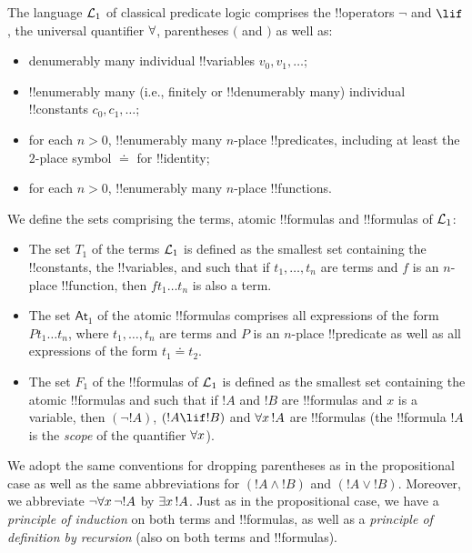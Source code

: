 \documentclass[../../include/open-logic-section]{subfiles}
\begin{document}


\begin{explain}
The language $\mathcal L_1$ of classical predicate logic comprises
the !!{operator}s $\lnot$ and $\lif$, the universal quantifier
$\lforall$, parentheses $($ and $)$ as well as:
\begin{itemize}
\item denumerably many individual !!{variable}s $v_0,v_1,\ldots$;
\item !!{enumerably} many (i.e., finitely or !!{denumerably} many)
individual
  !!{constant}s $c_0,c_1,\ldots$;
\item for each $n>0$, !!{enumerably} many $n$-place !!{predicate}s,
including at least the
  $2$-place symbol $\doteq$ for !!{identity};
\item for each $n>0$, !!{enumerably}  many   $n$-place !!{function}s.
\end{itemize}
\end{explain}

\begin{defn}
We define the sets comprising the terms, atomic !!{formula}s and
!!{formula}s
of $\mathcal L_1$:
  \begin{itemize}
  \item The set $T_1$ of the terms $\mathcal L_1$ is defined as the
    smallest set containing the !!{constant}s, the !!{variable}s, and such
    that if $t_1,\ldots,t_n$ are terms and $f$ is an $n$-place
    !!{function}, then $ft_1\ldots t_n$ is also a term.
  \item The set $\mathsf{At}_1$ of the atomic !!{formula}s comprises all
    expressions of the form $Pt_1\ldots t_n$, where $t_1,\ldots,t_n$
    are terms and $P$ is an $n$-place !!{predicate} as well as all
    expressions of the form $t_1 \doteq t_2$.
    \item The set $F_1$ of the !!{formula}s of $\mathcal L_1$ is defined
      as the smallest set containing the atomic !!{formula}s and such that
      if $!A$ and $!B$ are !!{formula}s and $x$ is a variable, then
$(\lnot !A)$, $(!A \lif !B)$ and $\lforall[x][!A]$ are !!{formula}s (the
!!{formula} $!A$ is the \emph{scope}
      of the quantifier $\lforall[x]$).
  \end{itemize}
\end{defn}

\begin{explain}
We adopt the same conventions for dropping parentheses as in the
propositional case as well as the same abbreviations for $(!A
\land !B)$ and $(!A \lor !B)$. Moreover, we abbreviate
$\lnot \lforall[x][\lnot !A]$ by $\lexists[x][!A]$. Just as in
the propositional case, we have a \emph{principle of induction} on
both terms and !!{formula}s, as well as a \emph{principle of definition by
  recursion} (also on both terms and !!{formula}s).
\end{explain}
\end{document}
